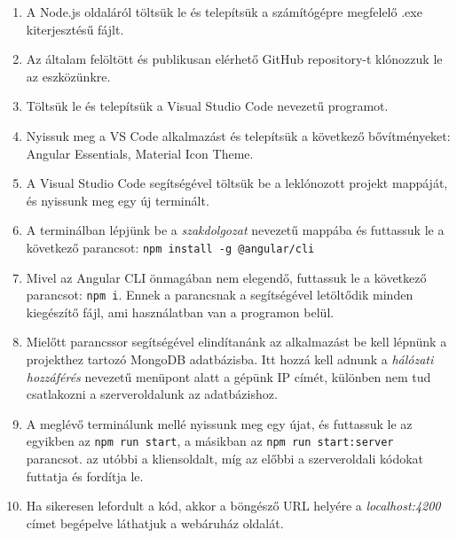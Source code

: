 \begin{enumerate}
	\item\label{step:first} A Node.js oldaláról\cite{nodejs:online} töltsük le és telepítsük a számítógépre megfelelő .exe kiterjesztésű fájlt.
	\item Az általam felöltött és publikusan elérhető GitHub repository-t\cite{szakdolgozat2021} klónozzuk le az eszközünkre.
	\item Töltsük le és telepítsük a Visual Studio Code\cite{vs:code} nevezetű programot.
	\item Nyissuk meg a VS Code alkalmazást és telepítsük a következő bővítményeket: Angular Essentials, Material Icon Theme.
	\item A Visual Studio Code segítségével töltsük be a leklónozott projekt mappáját, és nyissunk meg egy új terminált.
	\item A terminálban lépjünk be a \textit{szakdolgozat} nevezetű mappába és futtassuk le a következő parancsot: \verb|npm install -g @angular/cli|
	\item Mivel az Angular CLI önmagában nem elegendő, futtassuk le a következő parancsot: \verb|npm i|. Ennek a parancsnak a segítségével letöltődik minden kiegészítő fájl, ami használatban van a programon belül.
	\item Mielőtt parancssor segítségével elindítanánk az alkalmazást be kell lépnünk a projekthez tartozó MongoDB\cite{mongo} adatbázisba. Itt hozzá kell adnunk a \textit{hálózati hozzáférés} nevezetű menüpont alatt a gépünk IP címét, különben nem tud csatlakozni a szerveroldalunk az adatbázishoz.
	\item A meglévő terminálunk mellé nyissunk meg egy újat, és futtassuk le az egyikben az \verb|npm run start|, a másikban az \verb|npm run start:server| parancsot. az utóbbi a kliensoldalt, míg az előbbi a szerveroldali kódokat futtatja és fordítja le.
	\item Ha sikeresen lefordult a kód, akkor a böngésző URL helyére a \textit{localhost:4200} címet begépelve láthatjuk a webáruház oldalát.
\end{enumerate}


